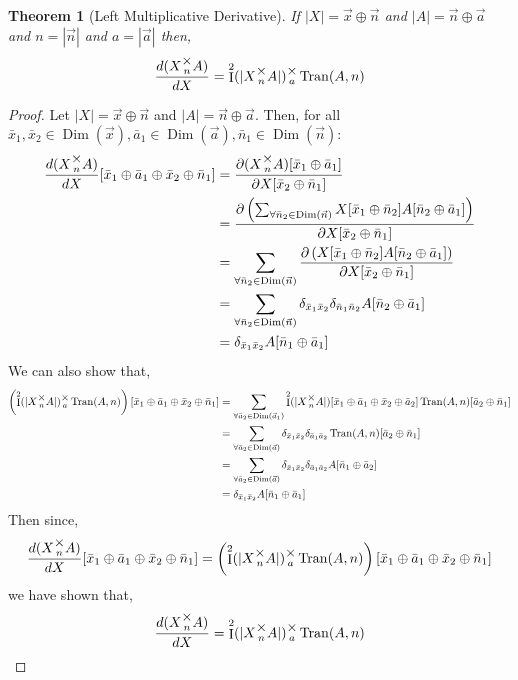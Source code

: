 \documentclass[12pt]{book}
\theoremstyle{plain}
\newtheorem{theorem}{Theorem}[chapter]
\theoremstyle{definition}
\theoremstyle{ppart}
\theoremstyle{case}
\theoremstyle{solution}
\DeclareMathOperator{\Dim}{Dim}
\DeclareMathOperator{\Ident}{I}
\DeclareMathOperator{\Tran}{Tran}
\newcommand{\mmult}[1]{\text{\raisebox{1ex}{$\underset{#1}{\times}$}}}
\begin{document}
\begin{landscape}
\begin{theorem}[Left Multiplicative Derivative]
\label{left_mult_derivative}
If $|X| = \vec{x} \oplus \vec{n}$ and $|A| = \vec{n} \oplus \vec{a}$
and $n = |\vec{n}|$ and $a = |\vec{a}|$ then,
\[ \frac{d(X \mmult{n} A)}{dX} = \Ident^2(|X \mmult{n} A|) \mmult{a} \Tran(A, n) \]
\end{theorem}
\begin{proof}
Let $|X| = \vec{x} \oplus \vec{n}$ and $|A| = \vec{n} \oplus \vec{a}$. Then,
for all
$\bar{x}_1, \bar{x}_2 \in \Dim(\vec{x}), \bar{a}_1 \in \Dim(\vec{a}),
\bar{n}_1 \in \Dim(\vec{n}):$
\begin{align*}
	\frac{d(X \mmult{n} A)}{dX}
	[\bar{x}_1 \oplus \bar{a}_1 \oplus \bar{x}_2 \oplus \bar{n}_1]
	&= 
	\frac{
		\partial (X \mmult{n} A) [\bar{x}_1 \oplus \bar{a}_1]
	}{\partial X[\bar{x}_2 \oplus \bar{n}_1]} \\
	&= 
	\frac{
		\partial \left(
			\sum_{\forall \bar{n}_2 \in \Dim(\vec{n})}
			X[\bar{x}_1 \oplus \bar{n}_2] A[\bar{n}_2 \oplus \bar{a}_1]
		\right)
	}{\partial X[\bar{x}_2 \oplus \bar{n}_1]} \\
	&= 
	\sum_{\forall \bar{n}_2 \in \Dim(\vec{n})}
	\frac{
		\partial \left(
			X[\bar{x}_1 \oplus \bar{n}_2] A[\bar{n}_2 \oplus \bar{a}_1]
		\right)
	}{\partial X[\bar{x}_2 \oplus \bar{n}_1]} \\
	&= 
	\sum_{\forall \bar{n}_2 \in \Dim(\vec{n})}
	\delta_{\bar{x}_1\bar{x}_2}
	\delta_{\bar{n}_1\bar{n}_2}
	A[\bar{n}_2 \oplus \bar{a}_1] \\
	&= 
	\delta_{\bar{x}_1\bar{x}_2}
	A[\bar{n}_1 \oplus \bar{a}_1]
\end{align*}
We can also show that,
\begin{align*}
	\left(\Ident^2(|X \mmult{n} A|) \mmult{a} \Tran(A, n)\right)
	[\bar{x}_1 \oplus \bar{a}_1 \oplus \bar{x}_2 \oplus \bar{n}_1]
	&=
	\sum_{\forall \bar{a}_2 \in \Dim(\vec{a}_1)}
	\Ident^2(|X \mmult{n} A|)[\bar{x}_1 \oplus \bar{a}_1 \oplus \bar{x}_2 \oplus \bar{a}_2]
	\Tran(A, n)[\bar{a}_2 \oplus \bar{n}_1] \\
	&=
	\sum_{\forall \bar{a}_2 \in \Dim(\vec{a})}
	\delta_{\bar{x}_1 \bar{x}_2} \delta_{\bar{a}_1 \bar{a}_2}
	\Tran(A, n)[\bar{a}_2 \oplus \bar{n}_1] \\
	&=
	\sum_{\forall \bar{a}_2 \in \Dim(\vec{a})}
	\delta_{\bar{x}_1 \bar{x}_2} \delta_{\bar{a}_1 \bar{a}_2}
	A[\bar{n}_1 \oplus \bar{a}_2] \\
	&=
	\delta_{\bar{x}_1 \bar{x}_2}
	A[\bar{n}_1 \oplus \bar{a}_1]
\end{align*}
Then since,
\[
	\frac{d(X \mmult{n} A)}{dX}
	[\bar{x}_1 \oplus \bar{a}_1 \oplus \bar{x}_2 \oplus \bar{n}_1]
	=
	\left(\Ident^2(|X \mmult{n} A|) \mmult{a} \Tran(A, n)\right)
	[\bar{x}_1 \oplus \bar{a}_1 \oplus \bar{x}_2 \oplus \bar{n}_1]
\]
we have shown that,
\[
	\frac{d(X \mmult{n} A)}{dX}
	=
	\Ident^2(|X \mmult{n} A|) \mmult{a} \Tran(A, n)
\]
\end{proof}
\end{landscape}
\end{document}
